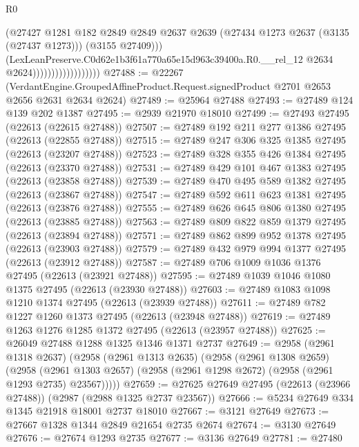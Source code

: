 \begin{lexlean}{R0}
\begin{coremodule}
                                        (@27427
                                          @1281
                                          @182
                                          @2849
                                          @2849
                                          @2637
                                          @2639
                                          (@27434 @1273 @2637 (@3135 (@27437 @1273)))
                                          (@3155 @27409)))
                                      (LexLeanPreserve.C0d62e1b3f61a770a65e15d963c39400a.R0.__rel_12
                                        @2634
                                        @2624))))))))))))))))))
@27488 := @22267
    (VerdantEngine.GroupedAffineProduct.Request.signedProduct @2701 @2653 @2656 @2631 @2634 @2624)
@27489 := @25964 @27488
@27493 := @27489 @124 @139 @202 @1387
@27495 := @2939 @21970 @18010
@27499 := @27493 @27495 (@22613 (@22615 @27488))
@27507 := @27489 @192 @211 @277 @1386 @27495 (@22613 (@22855 @27488))
@27515 := @27489 @247 @306 @325 @1385 @27495 (@22613 (@23207 @27488))
@27523 := @27489 @328 @355 @426 @1384 @27495 (@22613 (@23370 @27488))
@27531 := @27489 @429 @101 @467 @1383 @27495 (@22613 (@23858 @27488))
@27539 := @27489 @470 @495 @589 @1382 @27495 (@22613 (@23867 @27488))
@27547 := @27489 @592 @611 @623 @1381 @27495 (@22613 (@23876 @27488))
@27555 := @27489 @626 @645 @806 @1380 @27495 (@22613 (@23885 @27488))
@27563 := @27489 @809 @822 @859 @1379 @27495 (@22613 (@23894 @27488))
@27571 := @27489 @862 @899 @952 @1378 @27495 (@22613 (@23903 @27488))
@27579 := @27489 @432 @979 @994 @1377 @27495 (@22613 (@23912 @27488))
@27587 := @27489 @706 @1009 @1036 @1376 @27495 (@22613 (@23921 @27488))
@27595 := @27489 @1039 @1046 @1080 @1375 @27495 (@22613 (@23930 @27488))
@27603 := @27489 @1083 @1098 @1210 @1374 @27495 (@22613 (@23939 @27488))
@27611 := @27489 @782 @1227 @1260 @1373 @27495 (@22613 (@23948 @27488))
@27619 := @27489 @1263 @1276 @1285 @1372 @27495 (@22613 (@23957 @27488))
@27625 := @26049 @27488 @1288 @1325 @1346 @1371 @2737
@27649 := @2958
    (@2961 @1318 @2637)
    (@2958
      (@2961 @1313 @2635)
      (@2958
        (@2961 @1308 @2659)
        (@2958 (@2961 @1303 @2657) (@2958 (@2961 @1298 @2672) (@2958 (@2961 @1293 @2735) @23567)))))
@27659 := @27625 @27649 @27495 (@22613 (@23966 @27488)) (@2987 (@2988 @1325 @2737 @23567))
@27666 := @5234 @27649 @334 @1345 @21918 @18001 @2737 @18010
@27667 := @3121 @27649
@27673 := @27667 @1328 @1344 @2849 @21654 @2735 @2674
@27674 := @3130 @27649
@27676 := @27674 @1293 @2735
@27677 := @3136 @27649
@27781 := @27480

\end{coremodule}
\end{lexlean}
